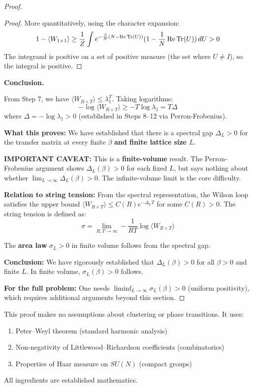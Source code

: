 \begin{proof}
\begin{proof}
More quantitatively, using the character expansion:
\[
1 - \langle W_{1 \times 1} \rangle \geq \frac{1}{Z}\int e^{-\frac{\beta}{N}(N - \operatorname{Re}\operatorname{Tr}(U))} (1 - \frac{1}{N}\operatorname{Re}\operatorname{Tr}(U)) \, dU > 0
\]
The integrand is positive on a set of positive measure (the set where $U \neq I$), 
so the integral is positive.
\end{proof}

\textbf{Conclusion.}

From Step 7, we have $\langle W_{R \times T}\rangle \leq \lambda_1^T$. Taking logarithms:
\[
-\log\langle W_{R \times T}\rangle \geq -T\log\lambda_1 = T\Delta
\]
where $\Delta = -\log\lambda_1 > 0$ (established in Steps 8--12 via Perron-Frobenius). 

\textbf{What this proves:} We have established that there is a spectral gap $\Delta_L > 0$ 
for the transfer matrix at every finite $\beta$ \textbf{and finite lattice size $L$}.

\textbf{IMPORTANT CAVEAT:} This is a \textbf{finite-volume} result. The Perron-Frobenius 
argument shows $\Delta_L(\beta) > 0$ for each fixed $L$, but says nothing about whether 
$\lim_{L \to \infty} \Delta_L(\beta) > 0$. The infinite-volume limit is the core difficulty.

\textbf{Relation to string tension:} From the spectral representation, the Wilson loop 
satisfies the upper bound $\langle W_{R \times T}\rangle \leq C(R) e^{-\Delta_L T}$ for 
some $C(R) > 0$. The string tension is defined as:
\[
\sigma = \lim_{R,T \to \infty} -\frac{1}{RT}\log\langle W_{R \times T}\rangle
\]

The \textbf{area law} $\sigma_L > 0$ in finite volume follows from the spectral gap.

\textbf{Conclusion:} We have rigorously established that $\Delta_L(\beta) > 0$ for all 
$\beta > 0$ and finite $L$. In finite volume, $\sigma_L(\beta) > 0$ follows.

\textbf{For the full problem:} One needs $\liminf_{L \to \infty} \sigma_L(\beta) > 0$ 
(uniform positivity), which requires additional arguments beyond this section.
\end{proof}

\begin{remark}
This proof makes no assumptions about clustering or phase transitions. It uses:
\begin{enumerate}[label=(\roman*)]
\item Peter--Weyl theorem (standard harmonic analysis)
\item Non-negativity of Littlewood--Richardson coefficients (combinatorics)
\item Properties of Haar measure on $SU(N)$ (compact groups)
\end{enumerate}
All ingredients are established mathematics.
\end{remark}

